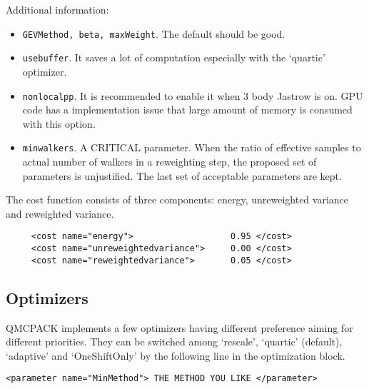 Additional information:
\begin{itemize}
\item \texttt{GEVMethod, beta, maxWeight}. The default should be good.
\item \texttt{usebuffer}. It saves a lot of computation especially with the `quartic' optimizer.
\item \texttt{nonlocalpp}. It is recommended to enable it when 3 body Jastrow is on. GPU code has a implementation issue that large amount of memory is consumed with this option.
\item \texttt{minwalkers}. A CRITICAL parameter. When the ratio of effective samples to actual number of walkers in a reweighting step, 
the proposed set of parameters is unjustified. The last set of acceptable parameters are kept.
\end{itemize}

The cost function consists of three components: energy, unreweighted variance and reweighted variance.
\begin{lstlisting}
     <cost name="energy">                   0.95 </cost>
     <cost name="unreweightedvariance">     0.00 </cost>
     <cost name="reweightedvariance">       0.05 </cost>
\end{lstlisting}

\subsection{Optimizers}
QMCPACK implements a few optimizers having different preference aiming for different priorities.
They can be switched among `rescale', `quartic' (default), `adaptive' and `OneShiftOnly' by the following line in the optimization block.
\begin{lstlisting}
<parameter name="MinMethod"> THE METHOD YOU LIKE </parameter>
\end{lstlisting}

